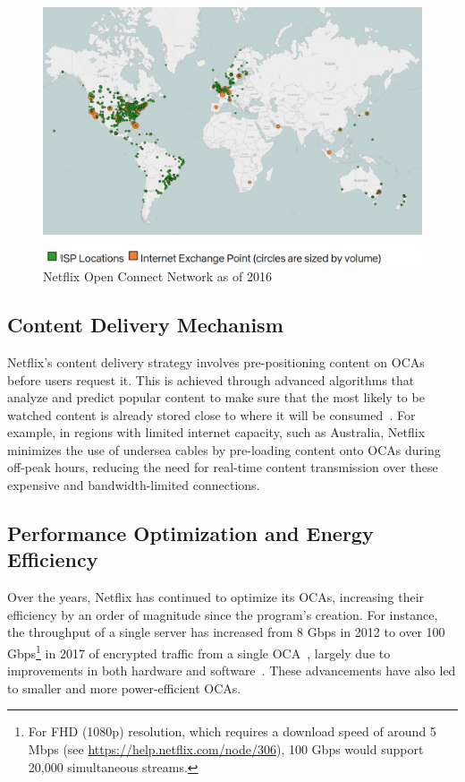 \begin{figure}[htpb]
    \centering
    \includegraphics[width=\linewidth]{images/NetflixISP.png}
    \caption[Netflix Open Connect Network as of 2016]{Netflix Open Connect Network as of 2016~\parencite{netflix_open_connect}}\label{fig:netflix-isp}
\end{figure}

\subsection{Content Delivery Mechanism}

Netflix's content delivery strategy involves pre-positioning content on \ac{OCAs} before users request it. This is achieved through advanced algorithms that analyze and predict popular content to make sure that the most likely to be watched content is already stored close to where it will be consumed~\parencite{netflix_cloud}. For example, in regions with limited internet capacity, such as Australia, Netflix minimizes the use of undersea cables by pre-loading content onto \ac{OCAs} during off-peak hours, reducing the need for real-time content transmission over these expensive and bandwidth-limited connections.

\subsection{Performance Optimization and Energy Efficiency}

Over the years, Netflix has continued to optimize its \ac{OCAs}, increasing their efficiency by an order of magnitude since the program's creation. For instance, the throughput of a single server has increased from 8 Gbps in 2012 to over 100 Gbps\footnote{For FHD (1080p) resolution, which requires a download speed of around 5 Mbps (see \url{https://help.netflix.com/node/306}), 100 Gbps would support 20,000 simultaneous streams.} in 2017 of encrypted traffic from a single OCA~\parencite{netflix_content_serving}, largely due to improvements in both hardware and software~\parencite{netflix_open_connect}. These advancements have also led to smaller and more power-efficient \ac{OCAs}.


